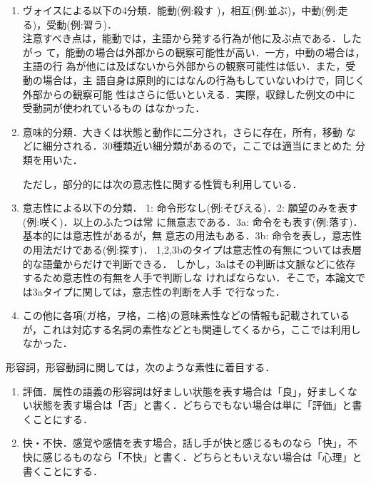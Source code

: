 \begin{enumerate}
\item ヴォイスによる以下の4分類．能動(例:殺す )，相互(例:並ぶ)，中動(例:走る)，受動(例:習う)．\\
注意すべき点は，能動では，主語から発する行為が他に及ぶ点である．したがっ
て，能動の場合は外部からの観察可能性が高い．一方，中動の場合は，主語の行
為が他には及ばないから外部からの観察可能性は低い．また，受動の場合は，主
語自身は原則的にはなんの行為もしていないわけで，同じく外部からの観察可能
性はさらに低いといえる．実際，収録した例文の中に受動詞が使われているもの
はなかった．

\item 意味的分類．大きくは状態と動作に二分され，さらに存在，所有，移動
  などに細分される．30種類近い細分類があるので，ここでは適当にまとめた
  分類を用いた．

\bigskip\hspace*{-3zw}\hspace*{-1mm}
ただし，部分的には次の意志性に関する性質も利用している．

\item 意志性による以下の分類．
1: 命令形なし(例:そびえる)．2: 願望のみを表す(例:咲く)．以上のふたつは常
に無意志である．3a: 命令をも表す(例:落す)．基本的には意志性があるが，無
意志の用法もある．3b: 命令を表し，意志性の用法だけである(例:探す)．
1,2,3bのタイプは意志性の有無については表層的な語彙からだけで判断できる．
しかし，3aはその判断は文脈などに依存するため意志性の有無を人手で判断しな
ければならない．そこで，本論文では3aタイプに関しては，意志性の判断を人手
で行なった．

\item この他に各項(ガ格，ヲ格，ニ格)の意味素性などの情報も記載されているが，これは対応する名詞の素性などとも関連してくるから，ここでは利用しなかった．

\end{enumerate}

\bigskip

形容詞，形容動詞に関しては，次のような素性に着目する．

\begin{enumerate}
\item 評価．属性の語義の形容詞は好ましい状態を表す場合は「良」，好ましくない状態を表す場合は「否」と書く．どちらでもない場合は単に「評価」と書くことにする．

\item 快・不快．感覚や感情を表す場合，話し手が快と感じるものなら「快」，不快に感じるものなら「不快」と書く．どちらともいえない場合は「心理」と書くことにする．

\end{enumerate}

